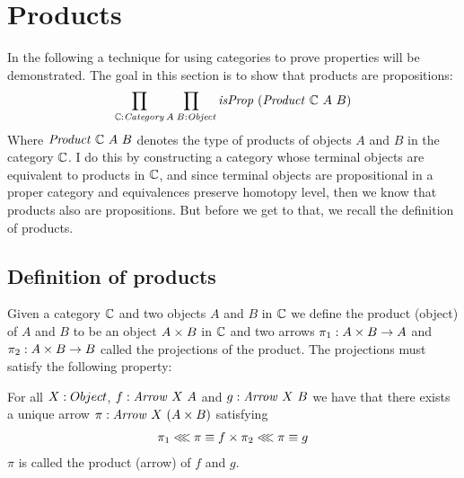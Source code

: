 



\section{Products}
\label{sec:products}
In the following a technique for using categories to prove properties will be
demonstrated. The goal in this section is to show that products are
propositions:
%
$$
\prod_{\bC \tp \Category} \prod_{A\;B \tp \Object} \isProp\ (\var{Product}\ \bC\ A\ B)
$$
%
Where $\mathit{Product}\ \mathbb{C}\ A\ B$ denotes the type of products of objects $A$
and $B$ in the category $\mathbb{C}$. I do this by constructing a category whose
terminal objects are equivalent to products in $\mathbb{C}$, and since terminal objects
are propositional in a proper category and equivalences preserve homotopy level,
then we know that products also are propositions. But before we get to that,
we recall the definition of products.

\subsection{Definition of products}
Given a category $\mathbb{C}$ and two objects $A$ and $B$ in $\mathbb{C}$ we define the
product (object) of $A$ and $B$ to be an object $A \times B$ in $\mathbb{C}$ and two arrows
$\pi_1 \mathrel{:} A \times B \to A$ and $\pi_2 \mathrel{:} A \times B \to B$ called the projections of
the product. The projections must satisfy the following property:

For all $X \mathrel{:} Object$, $f \tp \Arrow\ X\ A$ and $g \tp \Arrow\ X\ B$ we have
that there exists a unique arrow $\pi \tp \Arrow\ X\ (A \x B)$ satisfying
%
\begin{align}
\label{eq:umpProduct}
\pi_1 \lll \pi \equiv f \times \pi_2 \lll \pi \equiv g
\end{align}
%
$\pi$ is called the product (arrow) of $f$ and $g$.

